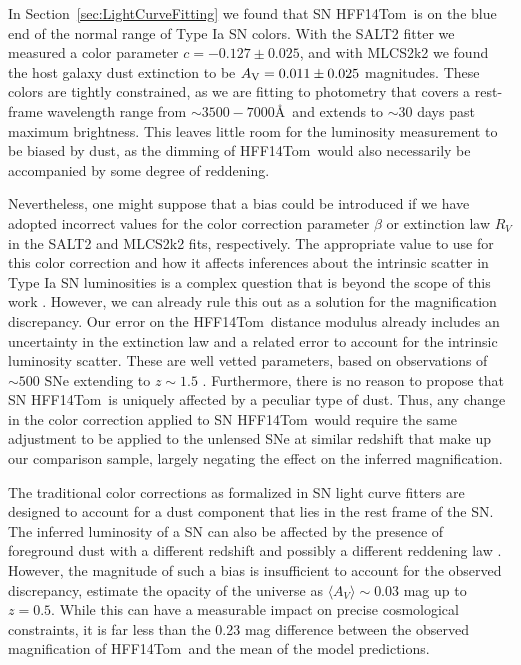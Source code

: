\documentclass[iop]{emulateapj}
\def\tomas{HFF14Tom}
\begin{document}
In Section~\ref{sec:LightCurveFitting} we found that SN \tomas\ is on
the blue end of the normal range of Type Ia SN colors.  With the SALT2
fitter we measured a color parameter $c=-0.127\pm0.025$, and with
MLCS2k2 we found the host galaxy dust extinction to be $A_{\rm
V}=0.011\pm0.025$ magnitudes.  These colors are tightly constrained,
as we are fitting to photometry that covers a rest-frame wavelength
range from $\sim3500-7000$\AA\ and extends to $\sim$30 days past
maximum brightness.  This leaves little room for the luminosity
measurement to be biased by dust, as the dimming of \tomas\ would also
necessarily be accompanied by some degree of reddening. 

Nevertheless, one might suppose that a bias could be introduced if we
have adopted incorrect values for the color correction parameter
$\beta$ or extinction law $R_V$ in the SALT2 and MLCS2k2 fits,
respectively.  The appropriate value to use for this color correction
and how it affects inferences about the intrinsic scatter in Type Ia
SN luminosities is a complex question that is beyond the scope of this
work \citep[see
e.g.][]{Marriner:2011,Chotard:2011,Kessler:2013,Scolnic:2014a}.
However, we can already rule this out as a solution for the
magnification discrepancy.  Our error on the \tomas\ distance modulus
already includes an uncertainty in the extinction law and a related
error to account for the intrinsic luminosity scatter. These are well
vetted parameters, based on observations of $\sim500$ SNe extending
to $z\sim1.5$ \citep{Sullivan:2011}.  Furthermore, there is no reason
to propose that SN \tomas\ is uniquely affected by a peculiar type of
dust.  Thus, any change in the color correction applied to SN \tomas\
would require the same adjustment to be applied to the unlensed SNe at
similar redshift that make up our comparison sample, largely negating
the effect on the inferred magnification. 

The traditional color corrections as formalized in SN light curve
fitters are designed to account for a dust component that lies in the
rest frame of the SN.  The inferred luminosity of a SN can also be
affected by the presence of foreground dust with a different redshift
and possibly a different reddening law \citep{Menard:2010b}.  However,
the magnitude of such a bias is insufficient to account for the
observed discrepancy, \citet{Menard:2010a} estimate the opacity of the
universe as $\langle A_{V}\rangle\sim0.03$ mag up to $z=0.5$.  While
this can have a measurable impact on precise cosmological constraints,
it is far less than the 0.23 mag difference between the observed
magnification of \tomas\ and the mean of the model predictions.  
\end{document}

